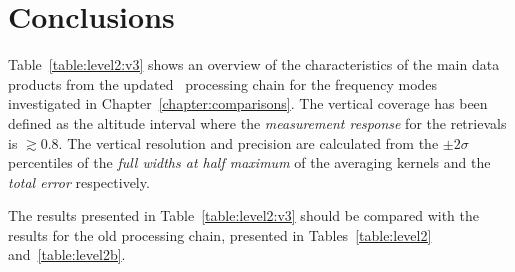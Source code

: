 \chapter{Conclusions}
\label{chapter:conclusions}
Table~\ref{table:level2:v3} shows an overview of the characteristics of the
main data products from the updated \smr\ processing chain for the frequency
modes investigated in Chapter~\ref{chapter:comparisons}. The vertical coverage
has been defined as the altitude interval where the \emph{measurement response}
for the retrievals is $\gtrsim 0.8$. The vertical resolution and precision are
calculated from the $\pm 2\sigma$ percentiles of the \emph{full widths at half
maximum} of the averaging kernels and the \emph{total error} respectively.

The results presented in Table~\ref{table:level2:v3} should be compared with
the results for the old processing chain, presented in
Tables~\ref{table:level2} and~\ref{table:level2b}.

